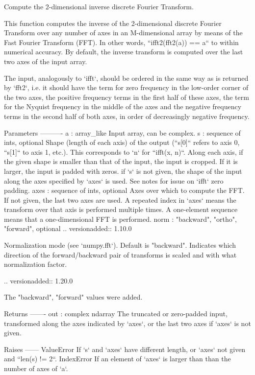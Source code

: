 \begin{DoxyVerb}Compute the 2-dimensional inverse discrete Fourier Transform.

This function computes the inverse of the 2-dimensional discrete Fourier
Transform over any number of axes in an M-dimensional array by means of
the Fast Fourier Transform (FFT).  In other words, ``ifft2(fft2(a)) == a``
to within numerical accuracy.  By default, the inverse transform is
computed over the last two axes of the input array.

The input, analogously to `ifft`, should be ordered in the same way as is
returned by `fft2`, i.e. it should have the term for zero frequency
in the low-order corner of the two axes, the positive frequency terms in
the first half of these axes, the term for the Nyquist frequency in the
middle of the axes and the negative frequency terms in the second half of
both axes, in order of decreasingly negative frequency.

Parameters
----------
a : array_like
    Input array, can be complex.
s : sequence of ints, optional
    Shape (length of each axis) of the output (``s[0]`` refers to axis 0,
    ``s[1]`` to axis 1, etc.).  This corresponds to `n` for ``ifft(x, n)``.
    Along each axis, if the given shape is smaller than that of the input,
    the input is cropped.  If it is larger, the input is padded with zeros.
    if `s` is not given, the shape of the input along the axes specified
    by `axes` is used.  See notes for issue on `ifft` zero padding.
axes : sequence of ints, optional
    Axes over which to compute the FFT.  If not given, the last two
    axes are used.  A repeated index in `axes` means the transform over
    that axis is performed multiple times.  A one-element sequence means
    that a one-dimensional FFT is performed.
norm : {"backward", "ortho", "forward"}, optional
    .. versionadded:: 1.10.0

    Normalization mode (see `numpy.fft`). Default is "backward".
    Indicates which direction of the forward/backward pair of transforms
    is scaled and with what normalization factor.

    .. versionadded:: 1.20.0

        The "backward", "forward" values were added.

Returns
-------
out : complex ndarray
    The truncated or zero-padded input, transformed along the axes
    indicated by `axes`, or the last two axes if `axes` is not given.

Raises
------
ValueError
    If `s` and `axes` have different length, or `axes` not given and
    ``len(s) != 2``.
IndexError
    If an element of `axes` is larger than than the number of axes of `a`.


\end{DoxyVerb}
